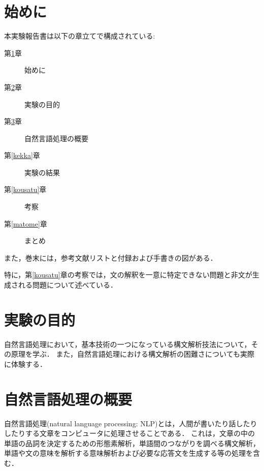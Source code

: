 \documentclass[uplatex, dvipdfmx, a4paper, twocolumn]{jsarticle}
\begin{document}
  \thispagestyle{empty}
  \saythanks

  \section{始めに}\label{hajimeni}
  本実験報告書は以下の章立てで構成されている:
  \begin{description}
    \item[第\ref{hajimeni}章] 始めに
    \item[第\ref{mokuteki}章] 実験の目的
    \item[第\ref{gaiyou}章] 自然言語処理の概要
    \item[第\ref{kekka}章] 実験の結果
    \item[第\ref{kousatu}章] 考察
    \item[第\ref{matome}章] まとめ
  \end{description}
  また，巻末には，参考文献リストと付録および手書きの図がある．

  特に，第\ref{kousatu}章の考察では，文の解釈を一意に特定できない問題と非文が生成される問題について述べている．

  \section{実験の目的}\label{mokuteki}
  自然言語処理において，基本技術の一つになっている構文解析技法について，その原理を学ぶ\cite{jikken3c1}．
  また，自然言語処理における構文解析の困難さについても実際に体験する．

  \section{自然言語処理の概要}\label{gaiyou}
  自然言語処理(natural language processing: NLP)とは，人間が書いたり話したりしたりする文章をコンピュータに処理させることである\cite{jikken3c1}．
  これは，文章の中の単語の品詞を決定するための形態素解析，単語間のつながりを調べる構文解析，単語や文の意味を解析する意味解析および必要な応答文を生成する等の処理を含む\cite{jikken3c1}．
\end{document}
